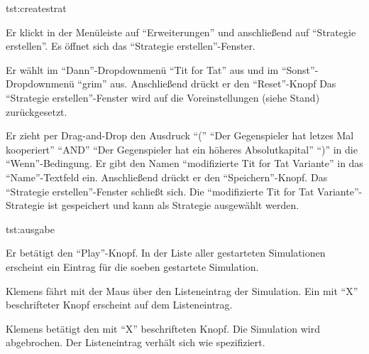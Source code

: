 \documentclass[parskip=full,11pt]{scrartcl}
\begin{document}
{tst:createstrat}

{Er klickt in der Menüleiste auf \enquote{Erweiterungen} und anschließend auf \enquote{Strategie erstellen}.}
{Es öffnet sich das \enquote{Strategie erstellen}-Fenster.}

{Er wählt im \enquote{Dann}-Dropdownmenü \enquote{Tit for Tat} aus und im \enquote{Sonst}-Dropdownmenü \enquote{grim} aus. Anschließend drückt er den \enquote{Reset}-Knopf}
{Das \enquote{Strategie erstellen}-Fenster wird auf die Voreinstellungen (siehe Stand) zurückgesetzt.}

{Er zieht per Drag-and-Drop den Ausdruck \enquote{(} \enquote{Der Gegenspieler hat letzes Mal kooperiert} \enquote{AND} \enquote{Der Gegenspieler hat ein höheres Absolutkapital} \enquote{)} in die \enquote{Wenn}-Bedingung. Er gibt den Namen \enquote{modifizierte Tit for Tat Variante} in das \enquote{Name}-Textfeld ein. Anschließend drückt er den \enquote{Speichern}-Knopf.}
{Das \enquote{Strategie erstellen}-Fenster schließt sich. Die \enquote{modifizierte Tit for Tat Variante}-Strategie ist gespeichert und kann als Strategie ausgewählt werden.}

{tst:ausgabe}

{Er betätigt den \enquote{Play}-Knopf.}
{In der Liste aller gestarteten Simulationen erscheint ein Eintrag für die soeben gestartete Simulation.}

{Klemens fährt mit der Maus über den Listeneintrag der Simulation.}
{Ein mit \enquote{X} beschrifteter Knopf erscheint auf dem Listeneintrag.}

{Klemens betätigt den mit \enquote{X} beschrifteten Knopf.}
{Die Simulation wird abgebrochen. Der Listeneintrag verhält sich wie spezifiziert.}
\end{document}
